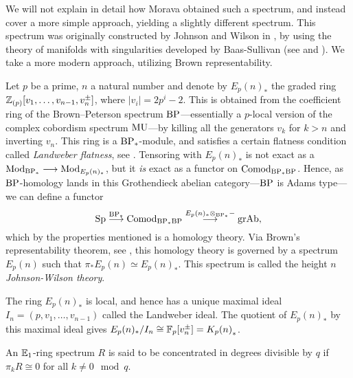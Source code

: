 We will not explain in detail how Morava obtained such a spectrum, and instead cover a more simple approach, yielding a slightly different spectrum. This spectrum was originally constructed by Johnson and Wilson in \cite{johnson-wilson_75}, by using the theory of manifolds with singularities developed by Baas-Sullivan (see \cite{baas_73a} and \cite{baas_73b}). We take a more modern approach, utilizing Brown representability. 

\begin{construction}
    Let $p$ be a prime, $n$ a natural number and denote by $E_p(n)_*$ the graded ring $\mathbb{Z}_{(p)}[v_1, \ldots, v_{n-1}, v_n^{\pm}]$, where $|v_i| = 2p^i-2$. This is obtained from the coefficient ring of the Brown--Peterson spectrum $\mathrm{BP}$---essentially a $p$-local version of the complex cobordism spectrum $\mathrm{MU}$---by killing all the generators $v_k$ for $k>n$ and inverting $v_n$. This ring is a $\mathrm{BP}_*$-module, and satisfies a certain flatness condition called \emph{Landweber flatness}, see \cite{landweber_76}. Tensoring with $E_p(n)_*$ is not exact as a $\mathrm{Mod}_{\mathrm{BP}_*}\longrightarrow \mathrm{Mod}_{E_p(n)_*}$, but it \emph{is} exact as a functor on $\mathrm{Comod}_{\mathrm{BP}_*\mathrm{BP}}$. Hence, as $\mathrm{BP}$-homology lands in this Grothendieck abelian category---$\mathrm{BP}$ is Adams type---we can define a functor 
    \[\mathrm{Sp} \overset{\mathrm{BP}_*}{\longrightarrow} \mathrm{Comod}_{\mathrm{BP}_*\mathrm{BP}}\overset{E_p(n)_*\otimes_{\mathrm{BP}_*}-}{\longrightarrow} \mathrm{gr}\mathrm{Ab},\]
    which by the properties mentioned is a homology theory. Via Brown's representability theorem, see \cite[Theorem 1]{brown_1962}, this homology theory is governed by a spectrum $E_p(n)$ such that $\pi_* E_p(n) \simeq E_p(n)_*$. This spectrum is called the height $n$ \emph{Johnson-Wilson theory}. 
\end{construction}

\begin{remark}
    \label{ch0:rm:K-as-quotient-of-E}
    The ring $E_p(n)_*$ is local, and hence has a unique maximal ideal $I_n = (p, v_1, \ldots, v_{n-1})$ called the Landweber ideal. The quotient of $E_p(n)_*$ by this maximal ideal gives $E_p(n)_*/I_n \cong \mathbb{F}_p[v_n^{\pm}] = {K_p(n)}_*$. %
\end{remark}

\begin{definition}
    An $\mathbb{E}_1$-ring spectrum $R$ is said to be concentrated in degrees divisible by $q$ if $\pi_k R \cong 0$ for all $k \not = 0 \mod q$. 
\end{definition}

